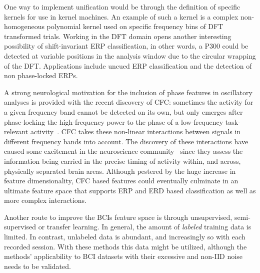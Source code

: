 \begin{sloppypar}
One way to implement unification would be through the definition of specific
kernels for use in kernel machines. An example of such a kernel is a complex
non-homogeneous polynomial kernel used on specific frequency bins of
\ac{DFT} transformed trials.
%
Working in the \ac{DFT} domain opens another interesting possibility of
shift-invariant \ac{ERP} classification, in other words, a P300 could be detected at
variable positions in the analysis window due to the circular wrapping of the
\ac{DFT}. Applications include uncued \ac{ERP} classification and the detection
of non phase-locked \acp{ERP}.

A strong neurological motivation for the inclusion of phase features in
oscillatory analyses is provided with the recent discovery of \ac{CFC}:
sometimes the activity for a given frequency band cannot be detected on its own,
but only emerges after phase-locking the high-frequency power to the phase of a
low-frequency task-relevant activity~\cite{cohen2011iat, osipova2008gpp}.
\Ac{CFC} takes these non-linear interactions between signals in different
frequency bands into account. The discovery of these interactions
have caused some excitement in the neuroscience community~\cite{canolty2006hgp,
colgin2009fgo} since they assess the information being carried in the precise
timing of activity within, and across, physically separated brain areas.
Although pestered by the huge increase in feature dimensionality, \Ac{CFC}
based features could eventually culminate in an ultimate feature space that
supports \ac{ERP} and \ac{ERD} based classification as well as more complex
interactions.
\end{sloppypar}

Another route to improve the \acp{BCI} feature space is through unsupervised,
semi-supervised or transfer learning. In general, the amount of \emph{labeled}
training data is limited. In contrast, unlabeled data is abundant, and
increasingly so with each recorded session. With these  methods this data might
be utilized, although the methods' applicability to \ac{BCI} datasets with
their excessive and non-\ac{IID} noise needs to be validated.


